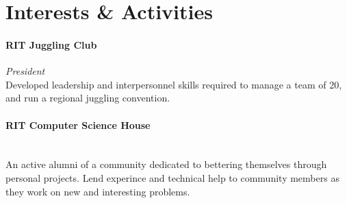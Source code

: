 \documentclass[10pt]{article}
\begin{document}
\section*{\large Interests \& Activities}
\paragraph{\bf RIT Juggling Club}{\it President}~\\
Developed leadership and interpersonnel skills required to manage a team of 20, and run a regional juggling convention.
\paragraph{\bf RIT Computer Science House}~\\
An active alumni of a community dedicated to bettering themselves through personal projects. Lend experince and technical help to community members as they work on new and interesting problems.
\end{document}
